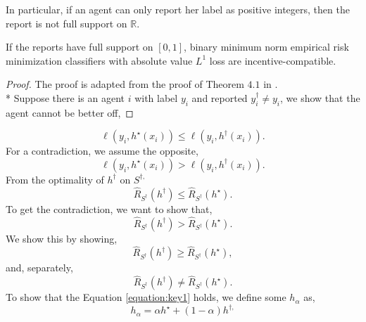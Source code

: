 \documentclass{article}
\begin{document}
In particular, if an agent can only report her label as positive integers, then the report is not full support on $\mathbb{R}$.
\newline \newline
\begin{lem} \label{lem:dfp} 
If the reports have full support on $\left[0, 1\right]$, binary minimum norm empirical risk minimization classifiers with absolute value $L^{1}$ loss are incentive-compatible.
\end{lem}
\begin{proof} \label{proof:dfppf} 
The proof is adapted from the proof of Theorem $4.1$ in \citet*{dekel2010incentive}.
\\* Suppose there is an agent $i $ with label $y_{i}$ and reported $y^{\dagger}_{i} \neq  y_{i}$, we show that the agent cannot be better off,
\end{proof}
\begin{equation} 
\ell\left(y_{i}, h^\star \left(x_{i}\right)\right) \leq  \ell\left(y_{i}, h^{\dagger}\left(x_{i}\right)\right).
\end{equation}
For a contradiction, we assume the opposite,
\begin{equation} 
\ell\left(y_{i}, h^\star \left(x_{i}\right)\right) > \ell\left(y_{i}, h^{\dagger}\left(x_{i}\right)\right).
\end{equation}
From the optimality of $h^{\dagger}$ on $S^{\dagger,}$
\begin{equation} 
\hat{R}_{S^{\dagger}}\left(h^{\dagger}\right) \leq  \hat{R}_{S^{\dagger}}\left(h^\star \right).
\end{equation}
To get the contradiction, we want to show that,
\begin{equation} 
\hat{R}_{S^{\dagger}}\left(h^{\dagger}\right) > \hat{R}_{S^{\dagger}}\left(h^\star \right).
\end{equation}
We show this by showing,
\begin{equation} \label{equation:key1} 
\hat{R}_{S^{\dagger}}\left(h^{\dagger}\right) \geq  \hat{R}_{S^{\dagger}}\left(h^\star \right),
\end{equation}
and, separately,
\begin{equation} \label{equation:key2} 
\hat{R}_{S^{\dagger}}\left(h^{\dagger}\right) \neq  \hat{R}_{S^{\dagger}}\left(h^\star \right).
\end{equation}
To show that the Equation \ref{equation:key1} holds, we define some $h_{\alpha}$ as,
\begin{equation} 
h_{\alpha} = \alpha h^\star  + \left(1 - \alpha\right) h^{\dagger,}
\end{equation}
\end{document}
